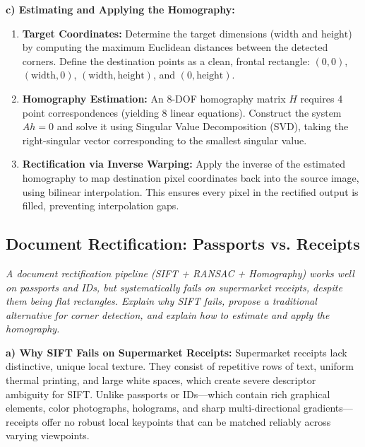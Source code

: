 \textbf{c) Estimating and Applying the Homography:}
\begin{enumerate}
    \item \textbf{Target Coordinates:} Determine the target dimensions ($\text{width}$ and $\text{height}$) by computing the maximum Euclidean distances between the detected corners. Define the destination points as a clean, frontal rectangle: $(0,0)$, $(\text{width}, 0)$, $(\text{width}, \text{height})$, and $(0, \text{height})$.
    \item \textbf{Homography Estimation:} An 8-DOF homography matrix $H$ requires 4 point correspondences (yielding 8 linear equations). Construct the system $Ah = 0$ and solve it using Singular Value Decomposition (SVD), taking the right-singular vector corresponding to the smallest singular value.
    \item \textbf{Rectification via Inverse Warping:} Apply the inverse of the estimated homography to map destination pixel coordinates back into the source image, using bilinear interpolation. This ensures every pixel in the rectified output is filled, preventing interpolation gaps.
\end{enumerate}

\subsection[Question -- {\it Document Rectification: Passports vs. Receipts (Extended)}]{}

\subsection{Document Rectification: Passports vs. Receipts}
\textit{A document rectification pipeline (SIFT + RANSAC + Homography) works well on passports and IDs, but systematically fails on supermarket receipts, despite them being flat rectangles. Explain why SIFT fails, propose a traditional alternative for corner detection, and explain how to estimate and apply the homography.}

\textbf{a) Why SIFT Fails on Supermarket Receipts:}
Supermarket receipts lack distinctive, unique local texture. They consist of repetitive rows of text, uniform thermal printing, and large white spaces, which create severe descriptor ambiguity for SIFT. Unlike passports or IDs---which contain rich graphical elements, color photographs, holograms, and sharp multi-directional gradients---receipts offer no robust local keypoints that can be matched reliably across varying viewpoints.

